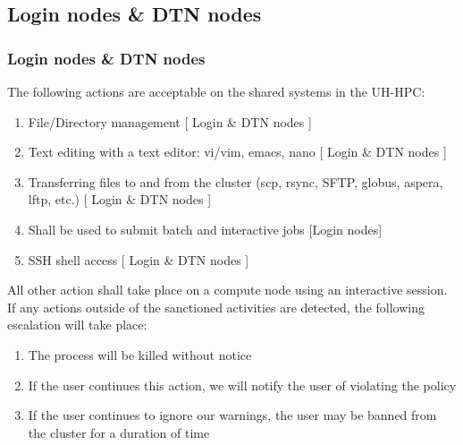 \subsection{Login nodes \& DTN nodes}
\begin{frame}
\frametitle{Login nodes \& DTN nodes}
\begin{block}{}
The following actions are acceptable on the shared systems in the UH-HPC:
\begin{enumerate}
\item File/Directory management [ Login \& DTN nodes ]
\item Text editing with a text editor: vi/vim, emacs, nano [ Login \& DTN nodes ]
\item Transferring files to and from the cluster (scp, rsync, SFTP, globus, aspera, lftp, etc.) [ Login \& DTN nodes ]
\item Shall be used to submit batch and interactive jobs [Login nodes]
\item SSH shell access [ Login \& DTN nodes ]
\end{enumerate}
\end{block}

\begin{block}{}
All other action shall take place on a compute node using an interactive session.  
If any actions outside of the sanctioned activities are detected, the following escalation will take place:
\begin{enumerate}
\item The process will be killed without notice
\item If the user continues this action, we will notify the user of violating the policy
\item If the user continues to ignore our warnings, the user may be banned from the cluster for a duration of time
\end{enumerate}
\end{block}
\end{frame}

